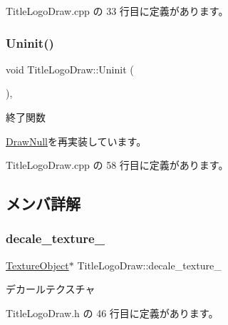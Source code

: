  Title\+Logo\+Draw.\+cpp の 33 行目に定義があります。

\mbox{\label{class_title_logo_draw_a07bbf9e8de5c7b9ee028408496c13c50}} 
\subsubsection{\texorpdfstring{Uninit()}{Uninit()}}
{\footnotesize\ttfamily void Title\+Logo\+Draw\+::\+Uninit (\begin{DoxyParamCaption}{ }\end{DoxyParamCaption})\hspace{0.3cm}{\ttfamily [override]}, {\ttfamily [virtual]}}



終了関数 



\mbox{\hyperlink{class_draw_null_a6e81d63efab7333e8d0e8af99362a4d9}{Draw\+Null}}を再実装しています。



 Title\+Logo\+Draw.\+cpp の 58 行目に定義があります。



\subsection{メンバ詳解}
\mbox{\label{class_title_logo_draw_a84be55e143853754d0b5f21647e3c595}} 
\subsubsection{\texorpdfstring{decale\+\_\+texture\+\_\+}{decale\_texture\_}}
{\footnotesize\ttfamily \mbox{\hyperlink{class_texture_object}{Texture\+Object}}$\ast$ Title\+Logo\+Draw\+::decale\+\_\+texture\+\_\+\hspace{0.3cm}{\ttfamily [private]}}



デカールテクスチャ 



 Title\+Logo\+Draw.\+h の 46 行目に定義があります。

